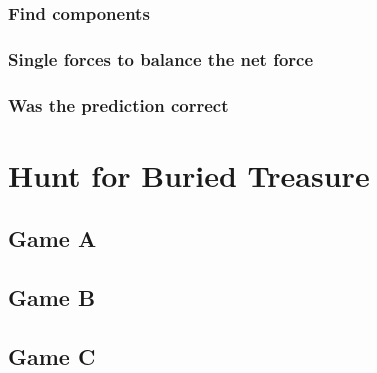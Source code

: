 \documentclass[11pt, letterpaper, includehead]{article}
\begin{document}
\subsubsection{Find components} %

\subsubsection{Single forces to balance the net force} %

\subsubsection{Was the prediction correct} %

\section{Hunt for Buried Treasure} %
\subsection{Game A} %
\subsection{Game B} %
\subsection{Game C} %
\end{document}
